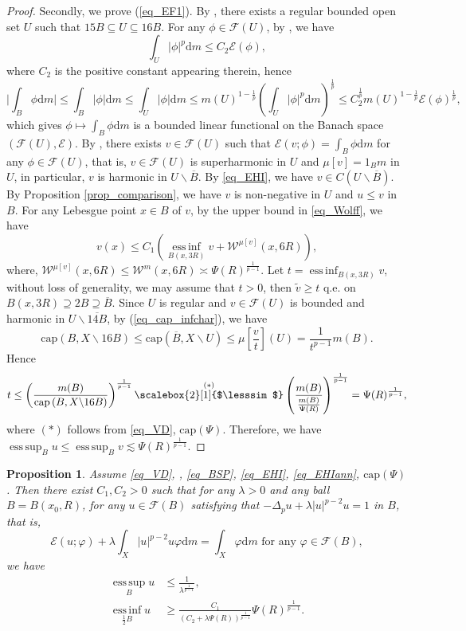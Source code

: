 \documentclass[11pt,a4paper]{article}
\numberwithin{equation}{section}
\newcommand{\esup}{\operatorname*{ess\,sup}}
\newcommand{\einf}{\operatorname*{ess\,inf}}
\theoremstyle{plain}
\newtheorem{proposition}[theorem]{Proposition}
\theoremstyle{definition}
\begin{document}
\begin{proof}
Secondly, we prove (\ref{eq_EF1}). By \hyperlink{eq_RBA}{}, there exists a regular bounded open set $U$ such that $15B\subseteq U\subseteq 16B$. For any $\phi\in\mathcal{F}(U)$, by \cite[Lemma 4.1]{Yan25c}, we have
$$\int_{U}|\phi|^p\mathrm{d} m\le C_2\mathcal{E}(\phi),$$
where $C_2$ is the positive constant appearing therein, hence
$$\lvert \int_{B}\phi \mathrm{d}m\rvert\le\int_{B}\lvert \phi\rvert \mathrm{d}m\le\int_U \lvert \phi\rvert \mathrm{d}m\le m(U)^{1-\frac{1}{p}}\left(\int_{U}|\phi|^p \mathrm{d} m\right)^{\frac{1}{p}}\le C_2^{\frac{1}{p}}m(U)^{1-\frac{1}{p}}\mathcal{E}(\phi)^{\frac{1}{p}},$$
which gives $\phi\mapsto \int_{B}\phi \mathrm{d} m$ is a bounded linear functional on the Banach space $(\mathcal{F}(U),\mathcal{E})$. By \cite[Theorem 3.24]{KS24a}, there exists $v\in\mathcal{F}(U)$ such that $\mathcal{E}(v;\phi)=\int_{B}\phi \mathrm{d} m$ for any $\phi\in\mathcal{F}(U)$, that is, $v\in \mathcal{F}(U)$ is superharmonic in $U$ and $\mu[v]=1_{B}m$ in $U$, in particular, $v$ is harmonic in $U\backslash \overline{B}$. By \ref{eq_EHI}, we have $v\in C(U\backslash \overline{B})$. By Proposition \ref{prop_comparison}, we have $v$ is non-negative in $U$ and $u\le v$ in $B$. For any Lebesgue point $x\in B$ of $v$, by the upper bound in \ref{eq_Wolff}, we have
$$v(x)\le C_1\left(\einf_{B(x,3R)}v+\mathcal{W}^{\mu[v]}(x,6R)\right),$$
where, $\mathcal{W}^{\mu[v]}(x,6R)\le \mathcal{W}^m(x,6R)\asymp \Psi(R)^{\frac{1}{p-1}}$. Let $t=\einf_{B(x,3R)}v$, without loss of generality, we may assume that $t>0$, then $\widetilde{v}\ge t$ q.e. on $B(x,3R)\supseteq 2B\supseteq \overline{B}$. Since $U$ is regular and $v\in \mathcal{F}(U)$ is bounded and harmonic in $U\backslash \overline{14B}$, by (\ref{eq_cap_infchar}), we have
$$\mathrm{cap}\left(B,X\backslash 16B\right)\le\mathrm{cap}\left(\overline{B},X\backslash U\right)\le \mu \left[\frac{v}{t}\right](U)=\frac{1}{t^{p-1}}m(B).$$
Hence
$$t\le \left(\frac{m(B)}{\mathrm{cap}\left(B,X\backslash 16B\right)}\right)^{\frac{1}{p-1}}\overset{(*)}{\scalebox{2}[1]{$\lesssim$}}\left(\frac{m(B)}{\frac{m(B)}{\Psi(R)}}\right)^{\frac{1}{p-1}}=\Psi(R)^{\frac{1}{p-1}},$$
where $(*)$ follows from \ref{eq_VD}, \hyperlink{eq_cap}{$\text{cap}(\Psi)$}. Therefore, we have $\esup_{B}u\le\esup_{B}v\lesssim\Psi(R)^{\frac{1}{p-1}}$.
\end{proof}

\begin{proposition}\label{prop_Poi_lambda}
Assume \ref{eq_VD}, \hyperlink{eq_LSC}{}, \ref{eq_BSP}, \ref{eq_EHI}, \ref{eq_EHIann}, \hyperlink{eq_cap}{$\text{cap}(\Psi)$}. Then there exist $C_1,C_2>0$ such that for any $\lambda>0$ and any ball $B=B(x_0,R)$, for any $u\in\mathcal{F}(B)$ satisfying that $-\Delta_pu+{\lambda}|u|^{p-2}u=1$ in $B$, that is,
$$\mathcal{E}(u;\varphi)+\lambda\int_X|u|^{p-2}u\varphi\mathrm{d} m=\int_X\varphi\mathrm{d} m\text{ for any }\varphi\in\mathcal{F}(B),$$
we have
\begin{align}
\esup_Bu&\le\frac{1}{\lambda^{\frac{1}{p-1}}},\nonumber\\
\einf_{\frac{1}{2}B}u&\ge\frac{C_1}{(C_2+\lambda\Psi(R))^{\frac{1}{p-1}}}{\Psi(R)^{\frac{1}{p-1}}}.\label{eq_lambda_lbd}
\end{align}
\end{proposition}
\end{document}
